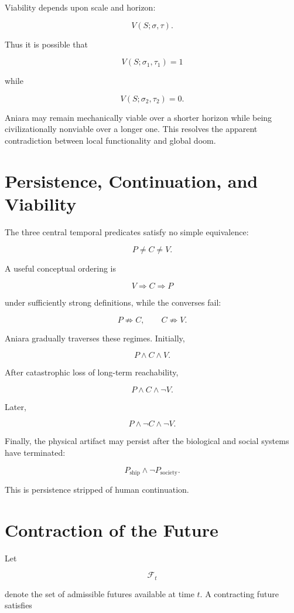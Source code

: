 \documentclass[11pt,oneside]{book}
\theoremstyle{definition}
\theoremstyle{remark}
\begin{document}
Viability depends upon scale and horizon:

\[
V(S;\sigma,\tau).
\]

Thus it is possible that

\[
V(S;\sigma_1,\tau_1)=1
\]

while

\[
V(S;\sigma_2,\tau_2)=0.
\]

Aniara may remain mechanically viable over a shorter horizon while being civilizationally nonviable
over a longer one. This resolves the apparent contradiction between local functionality and global
doom.

\section{Persistence, Continuation, and Viability}

The three central temporal predicates satisfy no simple equivalence:

\[
\boxed{ P\neq C\neq V. }
\]

A useful conceptual ordering is

\[
V\Rightarrow C\Rightarrow P
\]

under sufficiently strong definitions, while the converses fail:

\[
P\not\Rightarrow C, \qquad C\not\Rightarrow V.
\]

Aniara gradually traverses these regimes. Initially,

\[
P\land C\land V.
\]

After catastrophic loss of long-term reachability,

\[
P\land C\land\neg V.
\]

Later,

\[
P\land\neg C\land\neg V.
\]

Finally, the physical artifact may persist after the biological and social systems have terminated:

\[
P_{\mathrm{ship}} \land \neg P_{\mathrm{society}}.
\]

This is persistence stripped of human continuation.

\section{Contraction of the Future}

Let

\[
\mathcal{F}_t
\]

denote the set of admissible futures available at time \(t\). A contracting future satisfies
\end{document}
